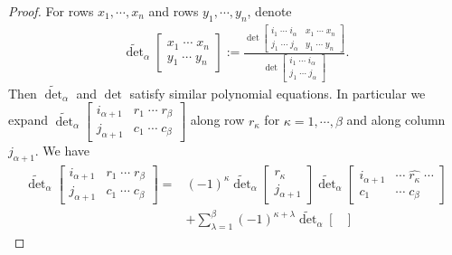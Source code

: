 \documentclass{amsart}
\begin{document}
{{        \begin{proof}
            For rows $x_1,\cdots,x_n$ and rows $y_1,\cdots,y_n$, denote 
            \begin{align}
                \widetilde{\det}_\alpha\begin{bmatrix}
                    x_1\;\cdots\;x_n\\y_1\;\cdots\;y_n
                \end{bmatrix}:=\frac{\det\begin{bmatrix}
                    i_1\;\cdots\;i_\alpha&x_1\;\cdots\;x_n\\
                    j_1\;\cdots\;j_\alpha&y_1\;\cdots\;y_n
                \end{bmatrix}}{\det\begin{bmatrix}
                    i_1\;\cdots\;i_\alpha\\
                    j_1\;\cdots\;j_\alpha
                \end{bmatrix}}. 
            \end{align}
            Then $\widetilde{\det}_\alpha$ and $\det$ satisfy similar polynomial equations. In particular we expand $\widetilde{\det}_\alpha\begin{bmatrix}
                i_{\alpha+1}&r_1\;\cdots\;r_\beta\\
                j_{\alpha+1}&c_1\;\cdots\;c_\beta
            \end{bmatrix}$ along row $r_\kappa$ for $\kappa=1,\cdots,\beta$ and along column $j_{\alpha+1}$. We have 
            \begin{align}
                \widetilde{\det}_\alpha\begin{bmatrix}
                    i_{\alpha+1}&r_1\;\cdots\;r_\beta\\
                    j_{\alpha+1}&c_1\;\cdots\;c_\beta
                \end{bmatrix}={}& (-1)^\kappa\widetilde{\det}_\alpha\begin{bmatrix}
                    r_\kappa\\
                    j_{\alpha+1}
                \end{bmatrix}\widetilde{\det}_\alpha\begin{bmatrix}
                    i_{\alpha+1}&\cdots\;\widehat{r_\kappa}\;\cdots\\
                    c_1&\cdots\;c_\beta
                \end{bmatrix}\\
                &+\sum_{\lambda=1}^\beta(-1)^{\kappa+\lambda}\widetilde{\det}_\alpha\begin{bmatrix}

\end{bmatrix}
\end{align}
\end{proof}}}
\end{document}
